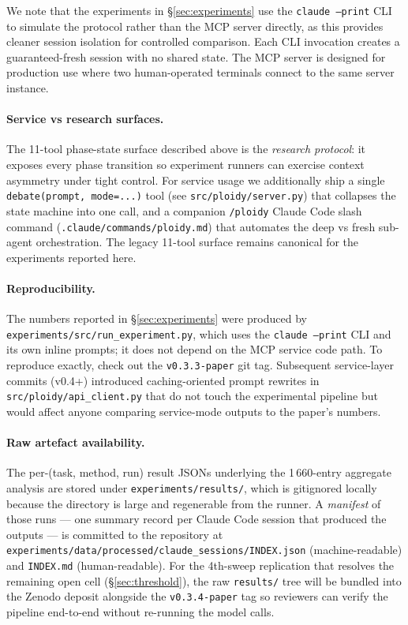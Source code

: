 \documentclass[11pt]{article}
\begin{document}
We note that the experiments in \S\ref{sec:experiments} use the \texttt{claude --print} CLI to simulate the protocol rather than the MCP server directly, as this provides cleaner session isolation for controlled comparison. Each CLI invocation creates a guaranteed-fresh session with no shared state. The MCP server is designed for production use where two human-operated terminals connect to the same server instance.

\paragraph{Service vs research surfaces.} The 11-tool phase-state surface described above is the \emph{research protocol}: it exposes every phase transition so experiment runners can exercise context asymmetry under tight control. For service usage we additionally ship a single \texttt{debate(prompt, mode=...)} tool (see \texttt{src/ploidy/server.py}) that collapses the state machine into one call, and a companion \texttt{/ploidy} Claude Code slash command (\texttt{.claude/commands/ploidy.md}) that automates the deep vs fresh sub-agent orchestration. The legacy 11-tool surface remains canonical for the experiments reported here.

\paragraph{Reproducibility.} The numbers reported in \S\ref{sec:experiments} were produced by \texttt{experiments/src/run\_experiment.py}, which uses the \texttt{claude --print} CLI and its own inline prompts; it does not depend on the MCP service code path. To reproduce exactly, check out the \texttt{v0.3.3-paper} git tag. Subsequent service-layer commits (v0.4+) introduced caching-oriented prompt rewrites in \texttt{src/ploidy/api\_client.py} that do not touch the experimental pipeline but would affect anyone comparing service-mode outputs to the paper's numbers.

\paragraph{Raw artefact availability.} The per-(task, method, run) result JSONs underlying the 1\,660-entry aggregate analysis are stored under \texttt{experiments/results/}, which is gitignored locally because the directory is large and regenerable from the runner. A \emph{manifest} of those runs — one summary record per Claude Code session that produced the outputs — is committed to the repository at \texttt{experiments/data/processed/claude\_sessions/INDEX.json} (machine-readable) and \texttt{INDEX.md} (human-readable). For the 4th-sweep replication that resolves the remaining open cell (\S\ref{sec:threshold}), the raw \texttt{results/} tree will be bundled into the Zenodo deposit alongside the \texttt{v0.3.4-paper} tag so reviewers can verify the pipeline end-to-end without re-running the model calls.
\end{document}
